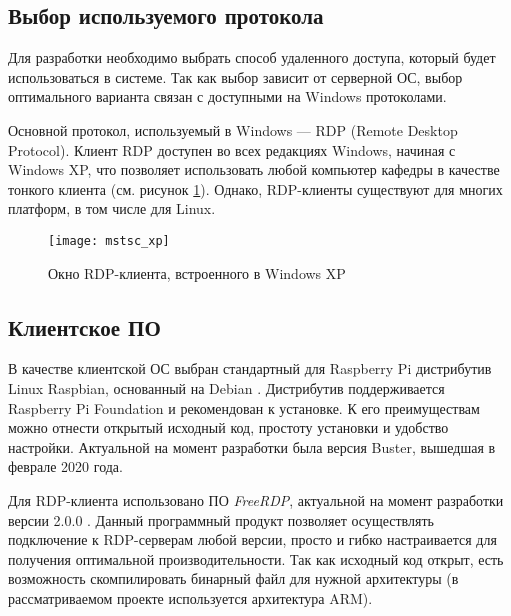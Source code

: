 \subsection{Выбор используемого протокола}

Для разработки необходимо выбрать способ удаленного доступа, который будет
использоваться в системе. Так как выбор зависит от серверной ОС, выбор оптимального
варианта связан с доступными на Windows протоколами.

Основной протокол, используемый в Windows — RDP (Remote Desktop Protocol). Клиент RDP
доступен во всех редакциях Windows, начиная с Windows XP, что позволяет использовать
любой компьютер кафедры в качестве тонкого клиента (см. рисунок \ref{pic:mstsc_xp}).
Однако, RDP-клиенты существуют для многих платформ, в том числе для Linux.

\begin{figure}[h]
    \center
    \texttt{[image: mstsc\_xp]}
    \caption{Окно RDP-клиента, встроенного в Windows XP}
    \label{pic:mstsc_xp}
\end{figure}

\subsection{Клиентское ПО}

В качестве клиентской ОС выбран стандартный для Raspberry Pi дистрибутив Linux Raspbian,
основанный на Debian \cite{ref:raspbian}.
Дистрибутив поддерживается Raspberry Pi Foundation и рекомендован к установке.
К его преимуществам можно отнести открытый исходный код, простоту установки и удобство 
настройки. 
Актуальной на момент разработки была версия Buster, вышедшая в феврале 2020 года.

Для RDP-клиента использовано ПО \textit{FreeRDP}, актуальной на момент разработки версии
2.0.0 \cite{ref:freerdp}. Данный программный продукт позволяет осуществлять подключение
к RDP-серверам любой версии, просто и гибко настраивается для получения оптимальной
производительности.  Так как исходный код открыт, есть возможность скомпилировать
бинарный файл для нужной архитектуры (в рассматриваемом проекте используется архитектура
ARM).
